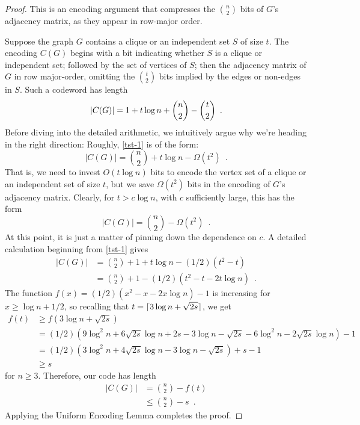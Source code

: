 \documentclass{patmorin}
\begin{document}
\begin{proof}
  This is an encoding argument that compresses the $\binom{n}{2}$ bits
  of $G$'s adjacency matrix, as they appear in row-major order.
  
  Suppose the graph $G$ contains a clique or an independent set $S$ of size
  $t$. The encoding $C(G)$ begins with a bit indicating whether $S$
  is a clique or independent set; followed by the set of vertices of $S$; 
  then the
  adjacency matrix of $G$ in row major-order, omitting
  the $\binom{t}{2}$ bits implied by the edges or non-edges in
  $S$. Such a codeword has length
  \begin{equation} 
    |C(G)|  = 1 + t\log n + \binom{n}{2}-\binom{t}{2} \enspace .  
    \eqlabel{tst-1}
  \end{equation}
  Before diving into the detailed arithmetic, we intuitively
  argue why we're heading in the right direction: Roughly,
  \eqref{tst-1} is of the form:
  \[ |C(G)|  = \binom{n}{2} + t\log n - \varOmega(t^2) \enspace . \]
  That is, we need to invest $O(t\log n)$ bits
  to encode the vertex set of a clique or an independent set of 
  size $t$, but we save $\varOmega(t^2)$ bits in the encoding of $G$'s 
  adjacency matrix.
  Clearly, for $t>c\log n$, with $c$ sufficiently large, this has the form 
  \[ |C(G)|  = \binom{n}{2} - \varOmega(t^2) \enspace . \]
  At this point, it is just a matter of pinning down the dependence on $c$.
  A detailed calculation beginning from \eqref{tst-1} gives
  \begin{align*}
    |C(G)| 
    & = \binom{n}{2} + 1 + t\log n - (1/2)(t^2 - t) \\
    & = \binom{n}{2} + 1 - (1/2)(t^2 - t - 2t \log n) \enspace .
  \end{align*}
  The function $f(x) = (1/2)(x^2 - x - 2x \log n) - 1$ is increasing
  for $x \geq \log n + 1/2$, so recalling that
$t = {\lceil 3\log n + \sqrt{2s} \rceil}$, we get
  \begin{align*}
    f(t) &\ge f(3\log n + \sqrt{2s}) \\
    &= (1/2)(9 \log^2 n + 6 \sqrt{2s} \log n + 2s - 3 \log n - \sqrt{2s} - 6 \log^2 n - 2 \sqrt{2s} \log n) - 1 \\
    &= (1/2)(3 \log^2 n + 4 \sqrt{2s} \log n - 3 \log n - \sqrt{2s}) + s - 1 \\
    &\ge s
  \end{align*}
  for $n \ge 3$. Therefore, our code has length
  \begin{align*}
    |C(G)| & = \binom{n}{2} - f(t) \\
    & \le \binom{n}{2} - s \enspace .
  \end{align*}
  Applying the Uniform Encoding Lemma completes the proof.
\end{proof}
\end{document}
